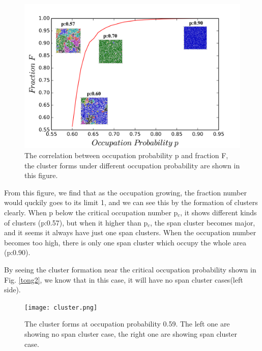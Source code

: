 \documentclass[print,onecolumn]{revtex4-1}
\begin{document}
\begin{figure}[htbp]
\begin{center}
\includegraphics[width=14cm]{P1.png}
\caption{The correlation between occupation probability p and fraction F, the cluster forms under different occupation probability are shown in this figure.}
\label{tong1}
\end{center}
\end{figure}



From this figure, we find that as the occupation growing, the fraction number would quckily goes to its limit 1, and we can see this by the formation of clusters clearly. When  p below the critical occupation number p$_c$,  it shows different kinds of clusters (p:0.57), but when it higher than p$_c$, the span cluster becomes major, and it seems it always have just one span clusters. When the occupation number becomes too high, there is only one span cluster which occupy the whole area (p:0.90). 

By seeing the cluster formation near the critical occupation probability shown in Fig. \ref{tong2}, we know that in this case, it will have no span cluster cases(left side).

\begin{figure}[htbp]
\begin{center}
\texttt{[image: cluster.png]}
\caption{The cluster forms at occupation probability 0.59. The left one are showing no span cluster case, the right one are showing span cluster case.}
\label{tong3}
\end{center}
\end{figure}
\end{document}
